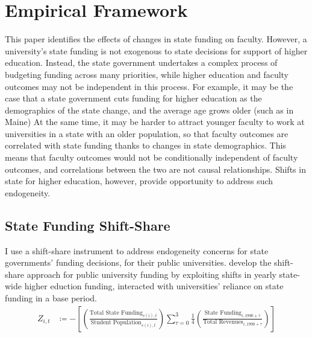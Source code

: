 \section{Empirical Framework}
\label{sec:empirics}

This paper identifies the effects of changes in state funding on faculty.
However, a university's state funding is not exogenous to state decisions for support of higher education.
Instead, the state government undertakes a complex process of budgeting funding across many priorities, while higher education and faculty outcomes may not be independent in this process.
For example, it may be the case that a state government cuts funding for higher education as the demographics of the state change, and the average age grows older (such as in Maine) 
At the same time, it may be harder to attract younger faculty to work at universities in a state with an older population, so that faculty outcomes are correlated with state funding thanks to changes in state demographics.
This means that faculty outcomes would not be conditionally independent of faculty outcomes, and correlations between the two are not causal relationships.
Shifts in state for higher education, however, provide opportunity to address such endogeneity.

\subsection{State Funding Shift-Share}
\label{sec:approp-shocks}
I use a shift-share instrument to address endogeneity concerns for state governments' funding decisions, for their public universities.
\cite{NBERw23736,NBERw27885} develop the shift-share approach for public university funding by exploiting shifts in yearly state-wide higher eduction funding, interacted with universities' reliance on state funding in a base period.
\begin{align}
    \label{eqn:public-instrument}
    Z_{i,t} &\coloneqq - \left[
    \left( \frac{\text{Total State Funding}_{s(i),t}}{\text{Student Population}_{s(i),t}} \right)
    \sum_{\tau = 0}^{3} \frac 14
    \left( \frac{\text{State Funding}_{i,1990 + \tau}}{\text{Total Revenues}_{i,1990 + \tau}} \right) \right]
\end{align}

